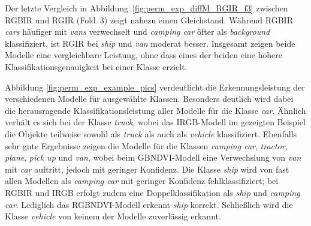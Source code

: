 %     

Der letzte Vergleich in Abbildung~\ref{fig:perm_exp_diffM_RGIR_f3} zwischen RGBIR und RGIR (Fold~3) zeigt nahezu einen Gleichstand. Während RGBIR \textit{cars} häufiger mit \textit{vans} verwechselt und \textit{camping car} öfter als \textit{background} klassifiziert, ist RGIR bei \textit{ship} und \textit{van} moderat besser. Insgesamt zeigen beide Modelle eine vergleichbare Leistung, ohne dass eines der beiden eine höhere Klassifikationsgenauigkeit bei einer Klasse erzielt.

Abbildung \ref{fig:perm_exp_example_pics} verdeutlicht die Erkennungsleistung der verschiedenen Modelle für ausgewählte Klassen. Besonders deutlich wird dabei die herausragende Klassifikationsleistung aller Modelle für die Klasse \textit{car}. Ähnlich verhält es sich bei der Klasse \textit{truck}, wobei das IRGB-Modell im gezeigten Beispiel die Objekte teilweise sowohl als \textit{truck} als auch als \textit{vehicle} klassifiziert. Ebenfalls sehr gute Ergebnisse zeigen die Modelle für die Klassen \textit{camping car}, \textit{tractor}, \textit{plane}, \textit{pick up} und \textit{van}, wobei beim GBNDVI-Modell eine Verwechslung von \textit{van} mit \textit{car} auftritt, jedoch mit geringer Konfidenz. Die Klasse \textit{ship} wird von fast allen Modellen als \textit{camping car} mit geringer Konfidenz fehlklassifiziert; bei RGBIR und IRGB erfolgt zudem eine Doppelklassifikation als \textit{ship} und \textit{camping car}. Lediglich das RGBNDVI-Modell erkennt \textit{ship} korrekt. Schließlich wird die Klasse \textit{vehicle} von keinem der Modelle zuverlässig erkannt.


\FloatBarrier

